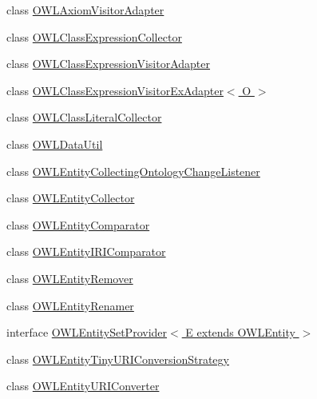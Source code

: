 \begin{DoxyCompactItemize}
class \hyperlink{classorg_1_1semanticweb_1_1owlapi_1_1util_1_1_o_w_l_axiom_visitor_adapter}{O\-W\-L\-Axiom\-Visitor\-Adapter}
\item 
class \hyperlink{classorg_1_1semanticweb_1_1owlapi_1_1util_1_1_o_w_l_class_expression_collector}{O\-W\-L\-Class\-Expression\-Collector}
\item 
class \hyperlink{classorg_1_1semanticweb_1_1owlapi_1_1util_1_1_o_w_l_class_expression_visitor_adapter}{O\-W\-L\-Class\-Expression\-Visitor\-Adapter}
\item 
class \hyperlink{classorg_1_1semanticweb_1_1owlapi_1_1util_1_1_o_w_l_class_expression_visitor_ex_adapter_3_01_o_01_4}{O\-W\-L\-Class\-Expression\-Visitor\-Ex\-Adapter$<$ O $>$}
\item 
class \hyperlink{classorg_1_1semanticweb_1_1owlapi_1_1util_1_1_o_w_l_class_literal_collector}{O\-W\-L\-Class\-Literal\-Collector}
\item 
class \hyperlink{classorg_1_1semanticweb_1_1owlapi_1_1util_1_1_o_w_l_data_util}{O\-W\-L\-Data\-Util}
\item 
class \hyperlink{classorg_1_1semanticweb_1_1owlapi_1_1util_1_1_o_w_l_entity_collecting_ontology_change_listener}{O\-W\-L\-Entity\-Collecting\-Ontology\-Change\-Listener}
\item 
class \hyperlink{classorg_1_1semanticweb_1_1owlapi_1_1util_1_1_o_w_l_entity_collector}{O\-W\-L\-Entity\-Collector}
\item 
class \hyperlink{classorg_1_1semanticweb_1_1owlapi_1_1util_1_1_o_w_l_entity_comparator}{O\-W\-L\-Entity\-Comparator}
\item 
class \hyperlink{classorg_1_1semanticweb_1_1owlapi_1_1util_1_1_o_w_l_entity_i_r_i_comparator}{O\-W\-L\-Entity\-I\-R\-I\-Comparator}
\item 
class \hyperlink{classorg_1_1semanticweb_1_1owlapi_1_1util_1_1_o_w_l_entity_remover}{O\-W\-L\-Entity\-Remover}
\item 
class \hyperlink{classorg_1_1semanticweb_1_1owlapi_1_1util_1_1_o_w_l_entity_renamer}{O\-W\-L\-Entity\-Renamer}
\item 
interface \hyperlink{interfaceorg_1_1semanticweb_1_1owlapi_1_1util_1_1_o_w_l_entity_set_provider_3_01_e_01extends_01_o_w_l_entity_01_4}{O\-W\-L\-Entity\-Set\-Provider$<$ E extends O\-W\-L\-Entity $>$}
\item 
class \hyperlink{classorg_1_1semanticweb_1_1owlapi_1_1util_1_1_o_w_l_entity_tiny_u_r_i_conversion_strategy}{O\-W\-L\-Entity\-Tiny\-U\-R\-I\-Conversion\-Strategy}
\item 
class \hyperlink{classorg_1_1semanticweb_1_1owlapi_1_1util_1_1_o_w_l_entity_u_r_i_converter}{O\-W\-L\-Entity\-U\-R\-I\-Converter}

\end{DoxyCompactItemize}
